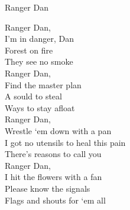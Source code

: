 Ranger Dan

Ranger Dan,\\
I'm in danger, Dan\\
Forest on fire\\
They see no smoke\\

Ranger Dan,\\
Find the master plan\\
A sould to steal\\
Ways to stay afloat\\

Ranger Dan,\\
Wrestle `em down with a pan\\
I got no utensils to heal this pain\\
There's reasons to call you\\

Ranger Dan,\\
I hit the flowers with a fan\\
Please know the signals\\
Flags and shouts for `em all\\ 

